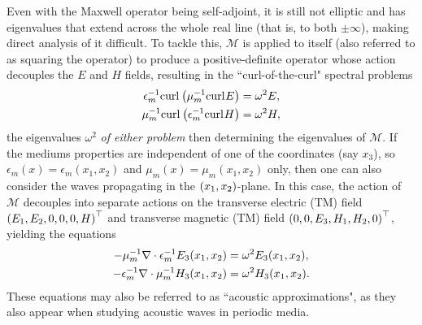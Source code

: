 Even with the Maxwell operator being self-adjoint, it is still not elliptic and has eigenvalues that extend across the whole real line (that is, to both $\pm\infty$), making direct analysis of it difficult.
To tackle this, $\mathcal{M}$ is applied to itself (also referred to as squaring the operator) to produce a positive-definite operator whose action decouples the $E$ and $H$ fields, resulting in the ``curl-of-the-curl" spectral problems
\begin{subequations} \label{eq:Intro-CurlCurlEqns}
	\begin{align}
		\epsilon_m^{-1}\mathrm{curl}_{}\left( \mu_m^{-1}\mathrm{curl}_{}E \right) &= \omega^2 E, \\
		\mu_m^{-1}\mathrm{curl}_{}\left( \epsilon_m^{-1}\mathrm{curl}_{}H \right) &= \omega^2 H,
	\end{align}
\end{subequations}
the eigenvalues $\omega^2$ \emph{of either problem} then determining the eigenvalues of $\mathcal{M}$.
If the mediums properties are independent of one of the coordinates (say $x_3$), so $\epsilon_m(x)=\epsilon_m(x_1,x_2)$ and $\mu_m(x)=\mu_m(x_1,x_2)$ only, then one can also consider the waves propagating in the $\left( x_1,x_2 \right)$-plane.
In this case, the action of $\mathcal{M}$ decouples into separate actions on the transverse electric (TM) field $\left( E_1,E_2,0,0,0,H \right)^\top$ and transverse magnetic (TM) field $\left( 0,0,E_3,H_1,H_2,0 \right)^\top$, yielding the equations
\begin{subequations} \label{eq:Intro-AcousticApprox}
	\begin{align}
		-\mu_m^{-1}\nabla\cdot\epsilon_m^{-1}E_3(x_1,x_2) &= \omega^2 E_3(x_1,x_2), \\
		-\epsilon_m^{-1}\nabla\cdot\mu_m^{-1}H_3(x_1,x_2) &= \omega^2 H_3(x_1,x_2).
	\end{align}
\end{subequations}
These equations may also be referred to as ``acoustic approximations", as they also appear when studying acoustic waves in periodic media.

